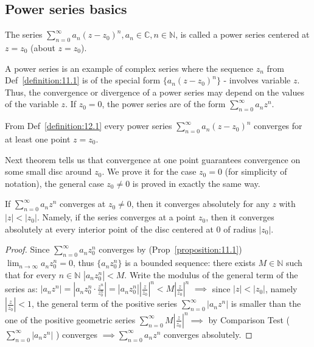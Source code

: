 \subsection{Power series basics}
\begin{definition}\label{definition:12.1} 
    The series $\sum_{n=0}^{\infty} a_n(z-z_0)^n, a_n \in \mathbb{C}, n \in \mathbb{N}$, is called a power series centered at $z = z_0$ (about $z = z_0$).
\end{definition}

A power series is an example of complex series where the sequence $z_n$ from Def~\ref{definition:11.1} is of the special form $\{a_n(z-z_0)^n\}$ - involves variable $z$. 
Thus, the convergence or divergence of a power series may depend on the values of the variable $z$. If $z_0 = 0$, the power series are of the form $\sum_{n=0}^{\infty} a_n z^n$.

\begin{remark}
From Def~\ref{definition:12.1} every power series $\sum_{n=0}^{\infty} a_n(z-z_0)^n$ converges for at least one point $z = z_0$.
\end{remark}
Next theorem tells us that convergence at one point guarantees convergence on some small disc around $z_0$. We prove it for the case $z_0 = 0$ (for simplicity of notation), the general case $z_0 \neq 0$ is proved in exactly the same way.

\begin{theorem}[Abel]\label{theorem:12.1}
    If $\sum_{n=0}^{\infty} a_n z^n$ converges at $z_0 \neq 0$, then it converges absolutely for any $z$ with $|z| < |z_0|$.
    Namely, if the series converges at a point $z_0$, then it converges absolutely at every interior point of the disc centered at $0$ of radius $|z_0|$.
\end{theorem}
    \begin{proof}
        Since $\sum_{n=0}^{\infty} a_n z_0^n$ converges by (Prop~\ref{proposition:11.1}) $\lim_{n \to \infty} a_n z_0^n = 0$, 
        thus $\{a_n z_0^n\}$ is a bounded sequence: there exists $M \in \mathbb{N}$ such that for every $n \in \mathbb{N}$ $|a_n z_0^n| < M$.
        Write the modulus of the general term of the series as: $|a_n z^n| = |a_n z_0^n \cdot \frac{z^n}{z_0^n}| = |a_n z_0^n| \left| \frac{z}{z_0} \right|^n < M \left| \frac{z}{z_0} \right|^n$
        $\implies$ since $|z| < |z_0|$, namely $\left| \frac{z}{z_0} \right| < 1$, the general term of the positive series $\sum_{n=0}^{\infty} |a_n z^n|$ is smaller than the one of the positive geometric 
        series $\sum_{n=0}^{\infty} M \left| \frac{z}{z_0} \right|^n \implies$ by Comparison Test
        ( $\sum_{n=0}^{\infty} |a_n z^n|$ ) converges $\implies \sum_{n=0}^{\infty} a_n z^n$ converges absolutely.
    \end{proof}
    
